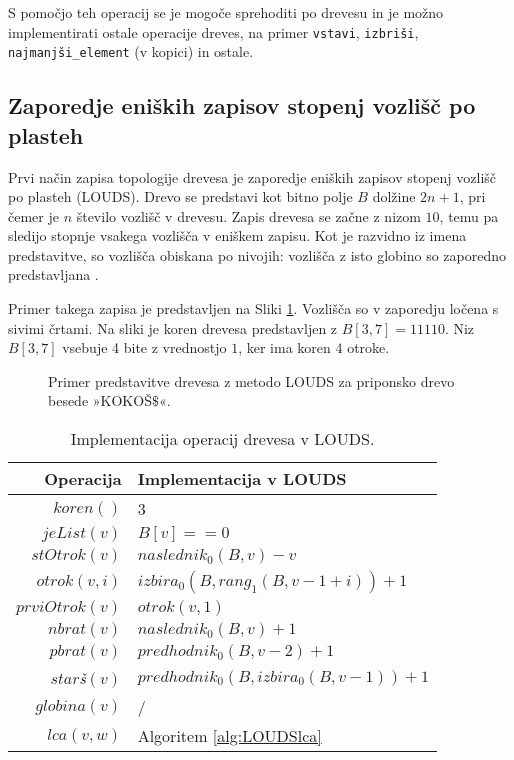 S pomočjo teh operacij se je mogoče sprehoditi po drevesu in je možno implementirati ostale operacije dreves, na primer \texttt{vstavi}, \texttt{izbriši}, \texttt{najmanjši\_element} (v kopici) in ostale.

\subsection{Zaporedje eniških zapisov stopenj vozlišč po plasteh}\label{sec:LOUDS}

Prvi način zapisa topologije drevesa je zaporedje eniških zapisov stopenj vozlišč po plasteh (LOUDS). Drevo se predstavi kot bitno polje $B$ dolžine $2n+1$, pri čemer je $n$ število vozlišč v drevesu. Zapis drevesa se začne z nizom $10$, temu pa sledijo stopnje vsakega vozlišča v eniškem zapisu. Kot je razvidno iz imena predstavitve, so vozlišča obiskana po nivojih: vozlišča z isto globino so zaporedno predstavljana \cite{Navarro2016}.

Primer takega zapisa je predstavljen na Sliki \ref{fig:LOUDS}. Vozlišča so v zaporedju ločena s sivimi črtami. Na sliki je koren drevesa predstavljen z $B[3,7]=11110$. Niz $B[3,7]$ vsebuje 4 bite z vrednostjo $1$, ker ima koren $4$ otroke.

\begin{figure}[htb]
    \begin{center}
        
        \caption{Primer predstavitve drevesa z metodo LOUDS za priponsko drevo besede »KOKOŠ$\$$«.} 
        \label{fig:LOUDS}
    \end{center}
\end{figure}

\begin{table}[htb]
    \centering
    \caption{Implementacija operacij drevesa v LOUDS.}
    \begin{tabular}{r|l}
\textbf{Operacija}& \textbf{Implementacija v LOUDS} \\\hline
         $koren()$& 3\\
         $jeList(v)$& $B[v]==0$\\
         $stOtrok(v)$& $naslednik_0(B,v)-v$\\
         $otrok(v,i)$& $izbira_0(B, rang_1(B, v - 1 + i))+1$\\
         $prviOtrok(v)$& $otrok(v,1)$\\
         $nbrat(v)$& $naslednik_0(B,v)+1$ \\
         $pbrat(v)$& $predhodnik_0(B,v-2)+1$ \\
         $star$\textit{š}$(v)$& $predhodnik_0(B,izbira_0(B,v-1))+1$ \\
         $globina(v)$& / \\
         $lca(v,w)$&  Algoritem \ref{alg:LOUDSlca}\\

    \end{tabular}
    \label{tab:LOUDSop}
\end{table}


